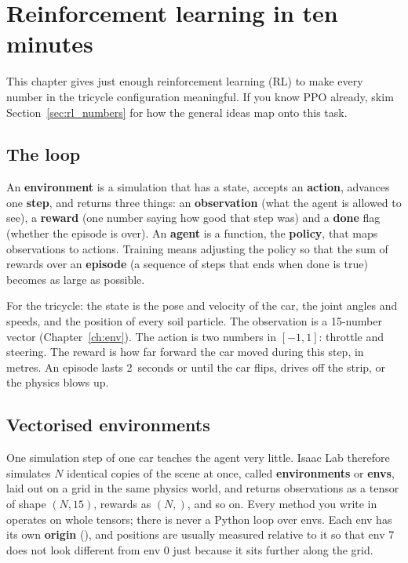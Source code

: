 \chapter{Reinforcement learning in ten minutes}
\label{ch:rl}

This chapter gives just enough reinforcement learning (RL) to make every
number in the tricycle configuration meaningful. If you know PPO already, skim
Section~\ref{sec:rl_numbers} for how the general ideas map onto this task.

\section{The loop}

An \textbf{environment} is a simulation that has a state, accepts an
\textbf{action}, advances one \textbf{step}, and returns three things: an
\textbf{observation} (what the agent is allowed to see), a \textbf{reward} (one
number saying how good that step was) and a \textbf{done} flag (whether the
episode is over). An \textbf{agent} is a function, the \textbf{policy}, that
maps observations to actions. Training means adjusting the policy so that the
sum of rewards over an \textbf{episode} (a sequence of steps that ends when
done is true) becomes as large as possible.

For the tricycle: the state is the pose and velocity of the car, the joint
angles and speeds, and the position of every soil particle. The observation is
a 15-number vector (Chapter~\ref{ch:env}). The action is two numbers in
$[-1,1]$: throttle and steering. The reward is how far forward the car moved
during this step, in metres. An episode lasts 2~seconds or until the car
flips, drives off the strip, or the physics blows up.

\section{Vectorised environments}

One simulation step of one car teaches the agent very little. Isaac Lab
therefore simulates $N$ identical copies of the scene at once, called
\textbf{environments} or \textbf{envs}, laid out on a grid in the same physics
world, and returns observations as a tensor of shape $(N, 15)$, rewards as
$(N,)$, and so on. Every method you write in  operates on
whole tensors; there is never a Python loop over envs. Each env has its own
\textbf{origin} (), and positions are usually measured
relative to it so that env 7 does not look different from env 0 just because it
sits further along the grid.

